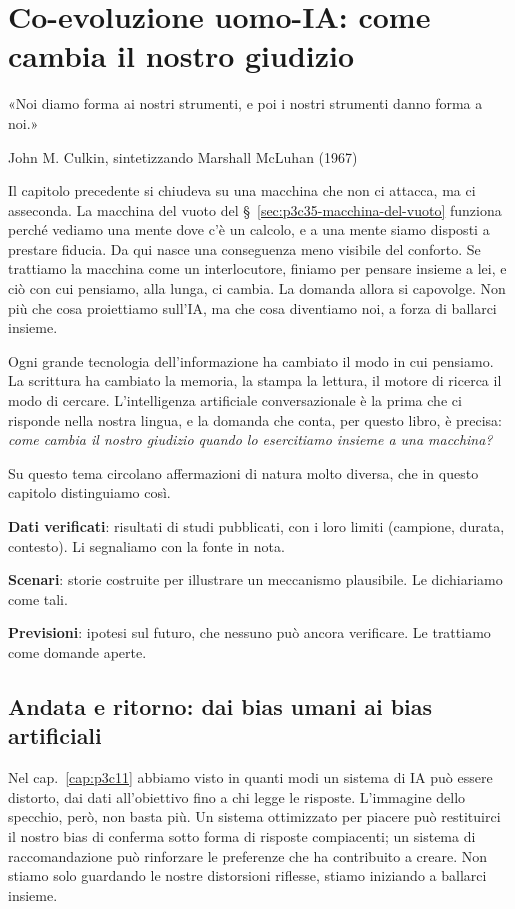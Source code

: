 \chapter{Co-evoluzione uomo-IA: come cambia il nostro giudizio}
\label{cap:p3c27}

\epigraph{«Noi diamo forma ai nostri strumenti, e poi i nostri strumenti danno forma a noi.»}{John M. Culkin, sintetizzando Marshall McLuhan (1967)}

Il capitolo precedente si chiudeva su una macchina che non ci attacca, ma ci asseconda. La macchina del vuoto del \S~\ref{sec:p3c35-macchina-del-vuoto} funziona perché vediamo una mente dove c'è un calcolo, e a una mente siamo disposti a prestare fiducia. Da qui nasce una conseguenza meno visibile del conforto. Se trattiamo la macchina come un interlocutore, finiamo per pensare insieme a lei, e ciò con cui pensiamo, alla lunga, ci cambia. La domanda allora si capovolge. Non più che cosa proiettiamo sull'IA, ma che cosa diventiamo noi, a forza di ballarci insieme.

Ogni grande tecnologia dell'informazione ha cambiato il modo in cui pensiamo. La scrittura ha cambiato la memoria, la stampa la lettura, il motore di ricerca il modo di cercare. L'intelligenza artificiale conversazionale è la prima che ci risponde nella nostra lingua, e la domanda che conta, per questo libro, è precisa: \textit{come cambia il nostro giudizio quando lo esercitiamo insieme a una macchina?}

Su questo tema circolano affermazioni di natura molto diversa, che in questo capitolo distinguiamo così.

\begin{concetto}
\textbf{Dati verificati}: risultati di studi pubblicati, con i loro limiti (campione, durata, contesto). Li segnaliamo con la fonte in nota.

\textbf{Scenari}: storie costruite per illustrare un meccanismo plausibile. Le dichiariamo come tali.

\textbf{Previsioni}: ipotesi sul futuro, che nessuno può ancora verificare. Le trattiamo come domande aperte.
\end{concetto}

\section{Andata e ritorno: dai bias umani ai bias artificiali}

Nel cap.~\ref{cap:p3c11} abbiamo visto in quanti modi un sistema di IA può essere distorto, dai dati all'obiettivo fino a chi legge le risposte. L'immagine dello specchio, però, non basta più. Un sistema ottimizzato per piacere può restituirci il nostro bias di conferma sotto forma di risposte compiacenti; un sistema di raccomandazione può rinforzare le preferenze che ha contribuito a creare. Non stiamo solo guardando le nostre distorsioni riflesse, stiamo iniziando a ballarci insieme.

